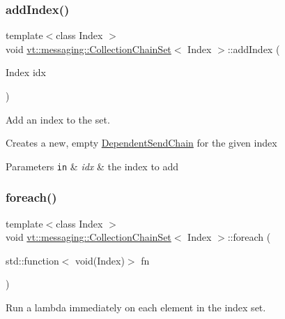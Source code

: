 \subsubsection{\texorpdfstring{add\+Index()}{addIndex()}}
{\footnotesize\ttfamily template$<$class Index $>$ \\
void \hyperlink{classvt_1_1messaging_1_1_collection_chain_set}{vt\+::messaging\+::\+Collection\+Chain\+Set}$<$ Index $>$\+::add\+Index (\begin{DoxyParamCaption}\item[{Index}]{idx }\end{DoxyParamCaption})\hspace{0.3cm}{\ttfamily [inline]}}



Add an index to the set. 

Creates a new, empty {\ttfamily \hyperlink{classvt_1_1messaging_1_1_dependent_send_chain}{Dependent\+Send\+Chain}} for the given index


\begin{DoxyParams}[1]{Parameters}
\mbox{\tt in}  & {\em idx} & the index to add \\
\hline
\end{DoxyParams}
\mbox{\label{classvt_1_1messaging_1_1_collection_chain_set_a5768b5b636799860a63ab182a1e34c9a}} 
\subsubsection{\texorpdfstring{foreach()}{foreach()}}
{\footnotesize\ttfamily template$<$class Index $>$ \\
void \hyperlink{classvt_1_1messaging_1_1_collection_chain_set}{vt\+::messaging\+::\+Collection\+Chain\+Set}$<$ Index $>$\+::foreach (\begin{DoxyParamCaption}\item[{std\+::function$<$ void(Index)$>$}]{fn }\end{DoxyParamCaption})\hspace{0.3cm}{\ttfamily [inline]}}



Run a lambda immediately on each element in the index set. 

